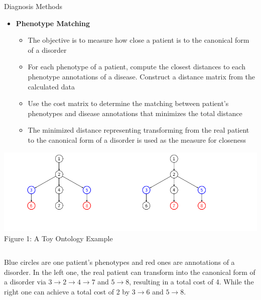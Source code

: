 \documentclass[final]{beamer} %
\begin{document}
\begin{frame}{}
\begin{columns}[T]
\begin{column}{0.3\linewidth}
\begin{block}{\Huge Diagnosis Methods}
\begin{itemize}
    \item
    \LARGE \textbf{Phenotype Matching}
     \begin{itemize}
     \Large
     \item
     The objective is to measure how close a patient is to the canonical form of a disorder
     \vspace{1cm}
     \item
     For each phenotype of a patient, compute the closest distances to each phenotype annotations of a disease. Construct a distance matrix from the calculated data
     \vspace{1cm}
    \item
    Use the cost matrix to determine the matching between patient's phenotypes and disease annotations that minimizes the total distance
     \vspace{1cm}
    \item
    The minimized distance representing transforming from the real patient to the canonical form of a disorder is used as the measure for closeness
         \end{itemize}
  \end{itemize}
   \vspace{3cm}
   \begin{center}
   \includegraphics[width=.9\textwidth]{toy_ontology}
   \\
   \normalsize
   Figure 1: A Toy Ontology Example
   \end{center}
   \begin{columns}[T]
   \begin{column}{.9\textwidth}
   \large
Blue circles are one patient's phenotypes and red ones are annotations of a disorder. In the left one, the real patient can transform into the canonical form of a disorder via $3 \rightarrow 2 \rightarrow 4 \rightarrow 7$ and $5 \rightarrow 8$, resulting in a total cost of 4. While the right one can achieve a total cost of 2 by $3 \rightarrow 6$ and $5 \rightarrow 8$.
   \end{column}
   \end{columns}
     \end{block}


\end{column}
\end{columns}
\end{frame}
\end{document}
